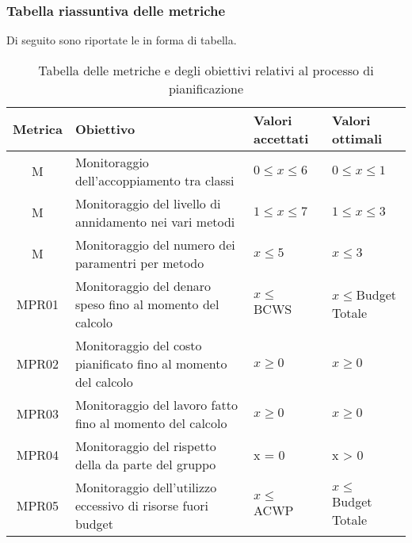 \subsubsection{Tabella riassuntiva delle metriche}%
Di seguito sono riportate le  in forma di tabella.
\begin{table}[H]
		\begin{center}
			\setlength{\aboverulesep}{0pt}
			\setlength{\belowrulesep}{0pt}
			\setlength{\extrarowheight}{.75ex}
			\begin{tabular}{ c C{6cm} C{3cm} C{3cm} }
				\textbf{Metrica} & \textbf{Obiettivo} & \textbf{Valori accettati} & \textbf{Valori ottimali}  \\
				\toprule
				M & Monitoraggio dell'accoppiamento tra classi & $ 0 \leq x \leq 6$ & $ 0 \leq x \leq 1$  \\
				M & Monitoraggio del livello di annidamento nei vari metodi & $1 \leq x \leq 7 $ & $1 \leq x \leq 3$ \\
				M & Monitoraggio del numero dei paramentri per metodo & $x \leq 5$ & $x \leq 3 $\\ 	
				MPR01 & Monitoraggio del denaro speso fino al momento del calcolo & $ x \leq $ BCWS & $x \leq $Budget Totale  \\
				MPR02 & Monitoraggio del costo pianificato fino al momento del calcolo & $ x \geq 0$ & $x \geq 0$\\
				MPR03 & Monitoraggio del lavoro fatto fino al momento del calcolo & $ x \geq 0 $ & $ x \geq 0 $ \\
				MPR04 & Monitoraggio del rispetto della  da parte del gruppo \gruppo{} & x = 0 & x > 0 \\
				MPR05 & Monitoraggio dell'utilizzo eccessivo di risorse fuori budget & $ x \leq$ ACWP & $ x \leq$ Budget Totale \\
				\bottomrule
			\end{tabular}
			\caption{Tabella delle metriche e degli obiettivi relativi al processo di pianificazione}
		\end{center}
	\end{table}



